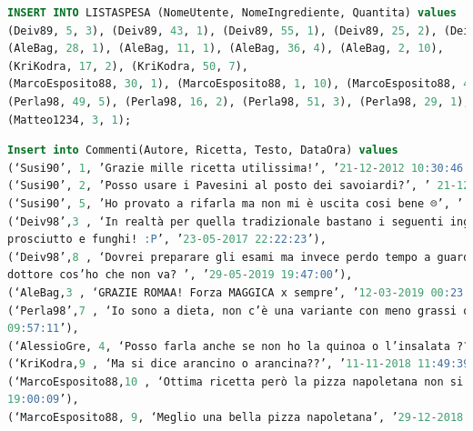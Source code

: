 \documentclass[12pt]{extarticle}
\begin{document}
\begin{lstlisting}[language=SQL]
    INSERT INTO LISTASPESA (NomeUtente, NomeIngrediente, Quantita) values
(Deiv89, 5, 3), (Deiv89, 43, 1), (Deiv89, 55, 1), (Deiv89, 25, 2), (Deiv89, 13, 3),
(AleBag, 28, 1), (AleBag, 11, 1), (AleBag, 36, 4), (AleBag, 2, 10),
(KriKodra, 17, 2), (KriKodra, 50, 7),
(MarcoEsposito88, 30, 1), (MarcoEsposito88, 1, 10), (MarcoEsposito88, 44, 3),
(Perla98, 49, 5), (Perla98, 16, 2), (Perla98, 51, 3), (Perla98, 29, 1), (Perla98, 33, 1),
(Matteo1234, 3, 1);
\end{lstlisting}
\begin{lstlisting}[language=SQL]
    Insert into Commenti(Autore, Ricetta, Testo, DataOra) values
(‘Susi90’, 1, ’Grazie mille ricetta utilissima!’, ’21-12-2012 10:30:46’),
(‘Susi90’, 2, ’Posso usare i Pavesini al posto dei savoiardi?’, ’ 21-12-2012 10:54:01’),
(‘Susi90’, 5, ’Ho provato a rifarla ma non mi è uscita cosi bene ☹’, ’ 01-01-2013 17:10:23’),
(‘Deiv98’,3 , ‘In realtà per quella tradizionale bastano i seguenti ingredienti: pasta, uova, panna,
prosciutto e funghi! :P’, ’23-05-2017 22:22:23’),
(‘Deiv98’,8 , ‘Dovrei preparare gli esami ma invece perdo tempo a guardare ricette su internet,
dottore cos’ho che non va? ’, ’29-05-2019 19:47:00’),
(‘AleBag,3 , ‘GRAZIE ROMAA! Forza MAGGICA x sempre’, ’12-03-2019 00:23:21’),
(‘Perla98’,7 , ‘Io sono a dieta, non c’è una variante con meno grassi o zuccheri? =)’, ’29-04-2019
09:57:11’),
(‘AlessioGre, 4, ‘Posso farla anche se non ho la quinoa o l’insalata ??’, ‘3-04-2019 08:27:55’),
(‘KriKodra,9 , ‘Ma si dice arancino o arancina??’, ’11-11-2018 11:49:39’),
(‘MarcoEsposito88,10 , ‘Ottima ricetta però la pizza napoletana non si batte!’, ’29-12-2018
19:00:09’),
(‘MarcoEsposito88, 9, ‘Meglio una bella pizza napoletana’, ’29-12-2018 19:14:33’);
\end{lstlisting}
\begin{lstlisting}[language=SQL]

\end{lstlisting}
\begin{lstlisting}[language=SQL]

\end{lstlisting}
\begin{lstlisting}[language=SQL]

\end{lstlisting}
\begin{lstlisting}[language=SQL]

\end{lstlisting}
\begin{lstlisting}[language=SQL]

\end{lstlisting}
\begin{lstlisting}[language=SQL]

\end{lstlisting}
\begin{lstlisting}[language=SQL]

\end{lstlisting}
\end{document}
